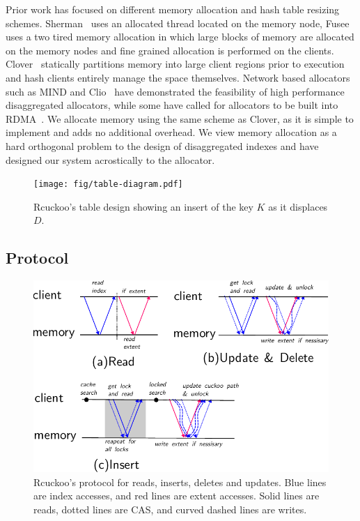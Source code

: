 Prior work has focused on different memory allocation and
hash table resizing schemes. Sherman~\cite{sherman} uses an
allocated thread located on the memory node,
Fusee~\cite{fusee} uses a two tired memory allocation in
which large blocks of memory are allocated on the memory
nodes and fine grained allocation is performed on the
clients. Clover~\cite{clover} statically partitions memory
into large client regions prior to execution and hash
clients entirely manage the space themselves. Network based
allocators such as MIND and Clio~\cite{mind,clio} have
demonstrated the feasibility of high performance
disaggregated allocators, while some have called for
allocators to be built into RDMA~\cite{prism}. We allocate
memory using the same scheme as Clover, as it is simple to
implement and adds no additional overhead. We view memory
allocation as a hard orthogonal problem to the design of
disaggregated indexes and have designed our system
acrostically to the allocator.




\begin{figure}[t]
    \texttt{[image: fig/table-diagram.pdf]}
    \caption{Rcuckoo's table design showing an insert of the key $K$ as it displaces $D$.}
    \label{fig:table-diagram}
\end{figure}


\subsection{Protocol}

\begin{figure}[t]
\includegraphics[width=0.99\linewidth]{fig/message_diagram.pdf}

\caption{Rcuckoo's protocol for reads, inserts, deletes and
updates. Blue lines are index accesses, and red lines are
extent accesses. Solid lines are reads, dotted lines are
CAS, and curved dashed lines are writes.}

\label{fig:message_diagram}
\end{figure}

